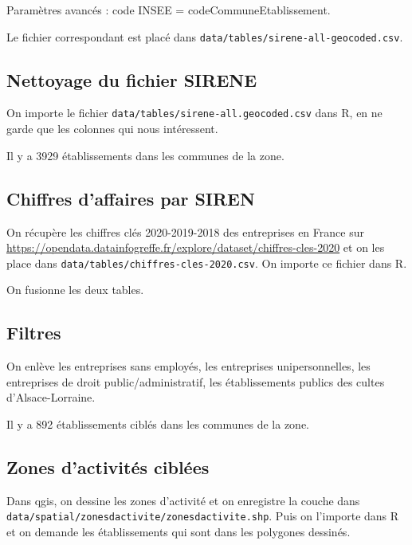 \documentclass[
  french,
]{article}
\begin{document}
Paramètres avancés : code INSEE = codeCommuneEtablissement.

Le fichier correspondant est placé dans
\texttt{data/tables/sirene-all-geocoded.csv}.

\hypertarget{nettoyage-du-fichier-sirene}{%
\subsection{Nettoyage du fichier
SIRENE}\label{nettoyage-du-fichier-sirene}}

On importe le fichier \texttt{data/tables/sirene-all.geocoded.csv} dans
R, en ne garde que les colonnes qui nous intéressent.

Il y a 3929 établissements dans les communes de la zone.

\hypertarget{chiffres-daffaires-par-siren}{%
\subsection{Chiffres d'affaires par
SIREN}\label{chiffres-daffaires-par-siren}}

On récupère les chiffres clés 2020-2019-2018 des entreprises en France
sur
\url{https://opendata.datainfogreffe.fr/explore/dataset/chiffres-cles-2020}
et on les place dans \texttt{data/tables/chiffres-cles-2020.csv}. On
importe ce fichier dans R.

On fusionne les deux tables.

\hypertarget{filtres}{%
\subsection{Filtres}\label{filtres}}

On enlève les entreprises sans employés, les entreprises
unipersonnelles, les entreprises de droit public/administratif, les
établissements publics des cultes d'Alsace-Lorraine.

Il y a 892 établissements ciblés dans les communes de la zone.

\hypertarget{zones-dactivituxe9s-cibluxe9es}{%
\subsection{Zones d'activités
ciblées}\label{zones-dactivituxe9s-cibluxe9es}}

Dans qgis, on dessine les zones d'activité et on enregistre la couche
dans \texttt{data/spatial/zonesdactivite/zonesdactivite.shp}. Puis on
l'importe dans R et on demande les établissements qui sont dans les
polygones dessinés.
\end{document}
